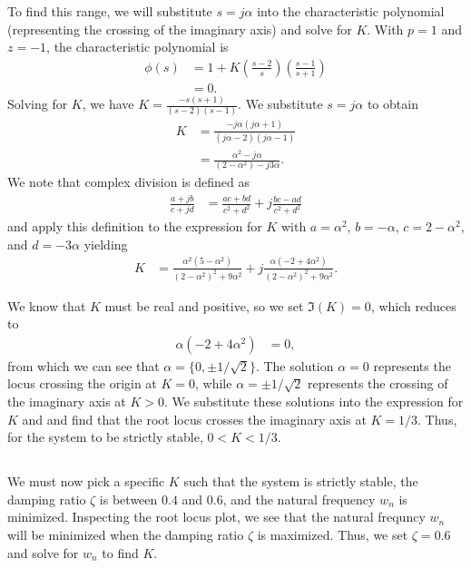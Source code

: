 \documentclass[paper=letter, fontsize=11pt]{scrartcl} %
\numberwithin{equation}{section} %
\numberwithin{figure}{section} %
\numberwithin{table}{section} %
\begin{document}
To find this range, we will substitute $s = j\alpha$ into
the characteristic polynomial (representing the crossing of the imaginary axis) and solve for $K$.
With $p = 1$ and $z = -1$, the characteristic polynomial is 
\begin{align*}
\phi(s) &= 1 + K (\frac{s - 2}{s}) (\frac{s - 1}{s + 1}) \\
&= 0.
\end{align*}
Solving for $K$, we have $K = \frac{-s(s + 1)}{(s-2)(s-1)}$. We substitute $s = j\alpha$ to obtain
\begin{align*}
K &= \frac{-j\alpha(j\alpha + 1)}{(j\alpha - 2)(j\alpha - 1)} \\
&= \frac{\alpha^2 - j \alpha}{(2-\alpha^2) - j3\alpha}.
\end{align*}
We note that complex division is defined as 
\begin{align*}
\frac{a + jb}{c + jd} &= \frac{ac + bd}{c^2 + d^2} + j\frac{bc - ad}{c^2 + d^2}
\end{align*}
and apply this definition to the expression for $K$ with $a = \alpha^2$, $b = -\alpha$,
$c = 2 - \alpha^2$, and $d = -3\alpha$ yielding
\begin{align*}
K &= \frac{\alpha^2(5 - \alpha^2)}{(2-\alpha^2)^2 + 9\alpha^2} 
     + j\frac{\alpha(-2 + 4\alpha^2)}{(2-\alpha^2)^2 + 9\alpha^2}.
\end{align*}

We know that $K$ must be real and positive, so we set $\Im(K) = 0$, which reduces to
\begin{align*}
\alpha(-2 + 4\alpha^2) &= 0,
\end{align*}
from which we can see that $\alpha = \{0, \pm 1/\sqrt{2}\}$. The solution $\alpha = 0$ 
represents the locus crossing the origin at $K = 0$, while $\alpha = \pm 1/\sqrt{2}$ represents
the crossing of the imaginary axis at $K > 0$. We substitute these solutions into the
expression for $K$ and and find that the root locus crosses the imaginary axis at $K = 1/3$.
Thus, for the system to be strictly stable, $0 < K < 1/3$.

\subsection{}
We must now pick a specific $K$ such that the system is strictly stable, the damping ratio $\zeta$
is between $0.4$ and $0.6$, and the natural frequency $w_n$ is minimized. Inspecting the 
root locus plot, we see that the natural frequncy $w_n$ will be minimized when the 
damping ratio $\zeta$ is maximized. Thus, we set $\zeta = 0.6$ and solve for $w_n$ to find
$K$.
\end{document}
